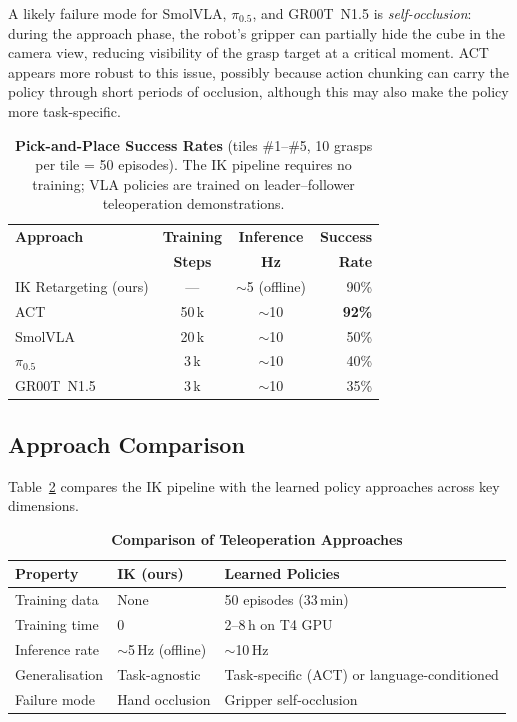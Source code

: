 \documentclass[10pt,journal]{IEEEtran}
\begin{document}
A likely failure mode for SmolVLA, $\pi_{0.5}$, and GR00T~N1.5
is \emph{self-occlusion}: during the approach phase, the robot's
gripper can partially hide the cube in the camera view, reducing
visibility of the grasp target at a critical moment. ACT appears more
robust to this issue, possibly because action chunking can carry the
policy through short periods of occlusion, although this may also make
the policy more task-specific.

\begin{table}[t]
\caption{\textbf{Pick-and-Place Success Rates} (tiles \#1--\#5, 10 grasps
  per tile = 50 episodes). The IK pipeline requires no training; VLA
  policies are trained on leader--follower teleoperation demonstrations.}
\label{tab:successrates}
\centering
\begin{tabular}{lccr}
\hline
\textbf{Approach} & \textbf{Training} & \textbf{Inference} & \textbf{Success} \\
                   & \textbf{Steps}    & \textbf{Hz}        & \textbf{Rate} \\
\hline
IK Retargeting (ours) & ---           & ${\sim}$5 (offline) & 90\% \\
ACT~\cite{zhao2023act}          & 50\,k  & ${\sim}$10 & \textbf{92\%} \\
SmolVLA~\cite{cadena2025smolvla} & 20\,k  & ${\sim}$10 & 50\% \\
$\pi_{0.5}$~\cite{black2024pi0} & 3\,k   & ${\sim}$10 & 40\% \\
GR00T~N1.5            & 3\,k          & ${\sim}$10 & 35\% \\
\hline
\end{tabular}
\end{table}

\subsection{Approach Comparison}

Table~\ref{tab:comparison} compares the IK pipeline with the learned
policy approaches across key dimensions.

\begin{table}[t]
\caption{\textbf{Comparison of Teleoperation Approaches}}
\label{tab:comparison}
\centering
\begin{tabular}{p{1.8cm}p{1.4cm}p{3.5cm}}
\hline
\textbf{Property} & \textbf{IK (ours)} & \textbf{Learned Policies} \\
\hline
Training data
  & None
  & 50 episodes (33\,min) \\
Training time
  & 0
  & 2--8\,h on T4 GPU \\
Inference rate
  & ${\sim}$5\,Hz (offline)
  & ${\sim}$10\,Hz \\
Generalisation
  & Task-agnostic
  & Task-specific (ACT) or language-conditioned \\
Failure mode
  & Hand occlusion
  & Gripper self-occlusion \\
\hline
\end{tabular}
\end{table}
\end{document}

